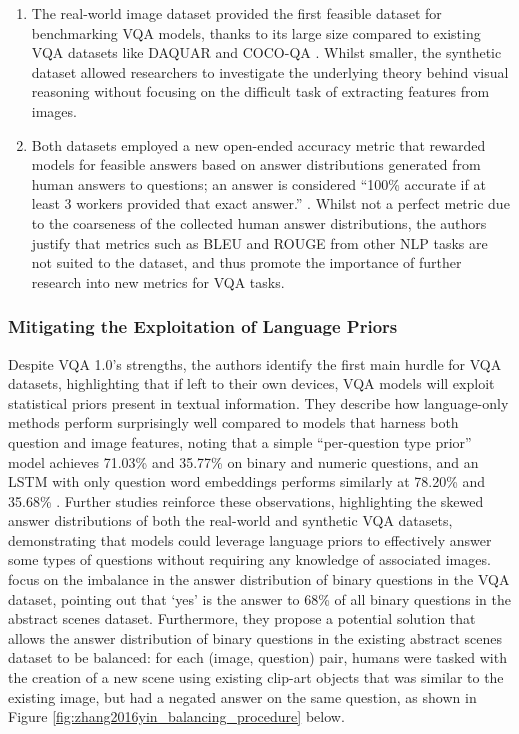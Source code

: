 \begin{enumerate}
    \item The real-world image dataset provided the first feasible dataset for benchmarking VQA models, thanks to its large size compared to existing VQA datasets like DAQUAR \cite{malinowski2014multiworld} and COCO-QA \cite{ren2015exploring}. Whilst smaller, the synthetic dataset allowed researchers to investigate the underlying theory behind visual reasoning without focusing on the difficult task of extracting features from images.
    \item Both datasets employed a new open-ended accuracy metric that rewarded models for feasible answers based on answer distributions generated from human answers to questions; an answer is considered ``100\% accurate if at least 3 workers provided that exact answer.'' \citeauthor{antol2015vqa}. Whilst not a perfect metric due to the coarseness of the collected human answer distributions, the authors justify that metrics such as BLEU and ROUGE from other NLP tasks are not suited to the dataset, and thus promote the importance of further research into new metrics for VQA tasks.
\end{enumerate}

\pagebreak

\subsubsection*{Mitigating the Exploitation of Language Priors} 

Despite VQA 1.0's strengths, the authors identify the first main hurdle for VQA datasets, highlighting that if left to their own devices, VQA models will exploit statistical priors present in textual information. They describe how language-only methods perform surprisingly well compared to models that harness both question and image features, noting that a simple ``per-question type prior'' model achieves 71.03\% and 35.77\% on binary and numeric questions, and an LSTM with only question word embeddings performs similarly at 78.20\% and 35.68\%  \cite{antol2015vqa}. Further studies \cite{goyal2017making, zhang2016yin} reinforce these observations, highlighting the skewed answer distributions of both the real-world and synthetic VQA datasets, demonstrating that models could leverage language priors to effectively answer some types of questions without requiring any knowledge of associated images. \citeauthor{zhang2016yin} focus on the imbalance in the answer distribution of binary questions in the VQA dataset, pointing out that `yes' is the answer to 68\% of all binary questions in the abstract scenes dataset. Furthermore, they propose a potential solution that allows the answer distribution of binary questions in the existing abstract scenes dataset to be balanced: for each (image, question) pair, humans were tasked with the creation of a new scene using existing clip-art objects \cite{zitnick2013bringing} that was similar to the existing image, but had a negated answer on the same question, as shown in Figure \ref{fig:zhang2016yin_balancing_procedure} below.

